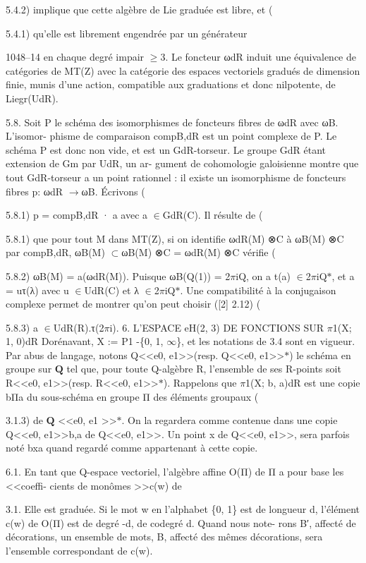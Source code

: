 \documentclass[11pt]{article}
\begin{document}
5.4.2) implique que cette algèbre de Lie graduée est libre, et (

5.4.1) qu’elle est librement engendrée par un générateur

1048--14 en chaque degré impair \(\ge\)3. Le foncteur ωdR induit une équivalence de catégories de MT(Z) avec la catégorie des espaces vectoriels gradués de dimension finie, munis d’une action, compatible aux graduations et donc nilpotente, de Liegr(UdR). 

5.8. Soit P le schéma des isomorphismes de foncteurs fibres de ωdR avec ωB. L’isomor- phisme de comparaison compB,dR est un point complexe de P. Le schéma P est donc non vide, et est un GdR-torseur. Le groupe GdR étant extension de Gm par UdR, un ar- gument de cohomologie galoisienne montre que tout GdR-torseur a un point rationnel : il existe un isomorphisme de foncteurs fibres p: ωdR \(\to\)ωB. Écrivons (

5.8.1) p = compB,dR · a avec a \(\in\)GdR(C). Il résulte de (

5.8.1) que pour tout M dans MT(Z), si on identifie ωdR(M) ⊗C à ωB(M) ⊗C par compB,dR, ωB(M) \(\subset\)ωB(M) ⊗C = ωdR(M) ⊗C vérifie (

5.8.2) ωB(M) = a(ωdR(M)). Puisque ωB(Q(1)) = 2\(\pi\)iQ, on a t(a) \(\in\)2\(\pi\)iQ\(*\), et a = uτ(λ) avec u \(\in\)UdR(C) et λ \(\in\)2\(\pi\)iQ\(*\). Une compatibilité à la conjugaison complexe permet de montrer qu’on peut choisir ([2] 2.12) (

5.8.3) a \(\in\)UdR(R).τ(2\(\pi\)i). 6. L’ESPACE eH(2, 3) DE FONCTIONS SUR \(\pi\)1(X; 1, 0)dR Dorénavant, X := P1 -\{0, 1, \(\infty\)\}, et les notations de 3.4 sont en vigueur. Par abus de langage, notons Q<<e0, e1>>(resp. Q<<e0, e1>>\(*\)) le schéma en groupe sur \(\mathbf Q\) tel que, pour toute Q-algèbre R, l’ensemble de ses R-points soit R<<e0, e1>>(resp. R<<e0, e1>>\(*\)). Rappelons que \(\pi\)1(X; b, a)dR est une copie bΠa du sous-schéma en groupe Π des éléments groupaux (

3.1.3) de \(\mathbf Q\) <<e0, e1 >>\(*\). On la regardera comme contenue dans une copie Q<<e0, e1>>b,a de Q<<e0, e1>>. Un point x de Q<<e0, e1>>, sera parfois noté bxa quand regardé comme appartenant à cette copie. 

6.1. En tant que Q-espace vectoriel, l’algèbre affine O(Π) de Π a pour base les <<coeffi- cients de monômes >>c(w) de 

3.1. Elle est graduée. Si le mot w en l’alphabet \{0, 1\} est de longueur d, l’élément c(w) de O(Π) est de degré -d, de codegré d. Quand nous note- rons B′, affecté de décorations, un ensemble de mots, B, affecté des mêmes décorations, sera l’ensemble correspondant de c(w).
\end{document}
